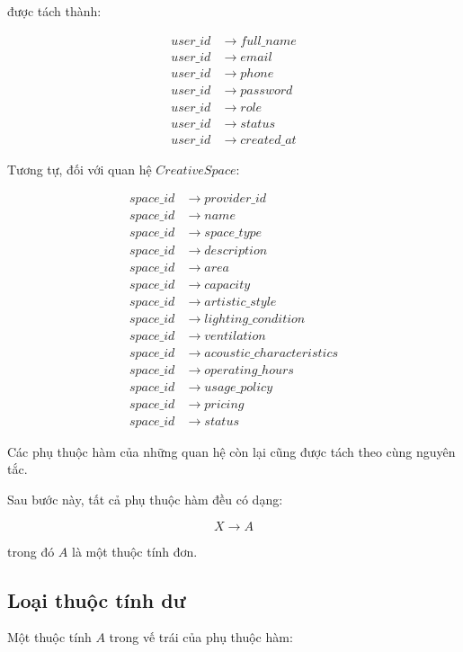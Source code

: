 được tách thành:

\[
\begin{aligned}
	user\_id &\rightarrow full\_name\\
	user\_id &\rightarrow email\\
	user\_id &\rightarrow phone\\
	user\_id &\rightarrow password\\
	user\_id &\rightarrow role\\
	user\_id &\rightarrow status\\
	user\_id &\rightarrow created\_at
\end{aligned}
\]

Tương tự, đối với quan hệ $CreativeSpace$:

\[
\begin{aligned}
	space\_id &\rightarrow provider\_id\\
	space\_id &\rightarrow name\\
	space\_id &\rightarrow space\_type\\
	space\_id &\rightarrow description\\
	space\_id &\rightarrow area\\
	space\_id &\rightarrow capacity\\
	space\_id &\rightarrow artistic\_style\\
	space\_id &\rightarrow lighting\_condition\\
	space\_id &\rightarrow ventilation\\
	space\_id &\rightarrow acoustic\_characteristics\\
	space\_id &\rightarrow operating\_hours\\
	space\_id &\rightarrow usage\_policy\\
	space\_id &\rightarrow pricing\\
	space\_id &\rightarrow status
\end{aligned}
\]

Các phụ thuộc hàm của những quan hệ còn lại cũng được tách theo cùng
nguyên tắc.

Sau bước này, tất cả phụ thuộc hàm đều có dạng:

\[
X \rightarrow A
\]

trong đó $A$ là một thuộc tính đơn.

\subsection{Loại thuộc tính dư}

Một thuộc tính $A$ trong vế trái của phụ thuộc hàm:

